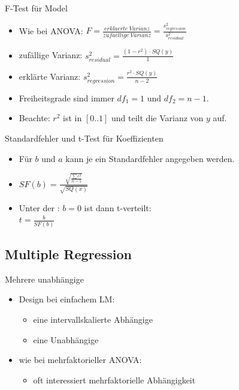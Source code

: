 \begin{frame}
  {F-Test für Model}
  \begin{itemize}[<+->]
    \item Wie bei ANOVA: \alert{$F=\frac{erklaerte\ Varianz}{zufaellige\ Varianz}=\frac{s^2_{regression}}{s^2_{residual}}$}
      \vspace{0.5cm}
    \item zufällige Varianz: \alert{$s^2_{residual}=\frac{(1-r^2)\cdot SQ(y)}{1}$}
    \item erklärte Varianz: \alert{$s^2_{regression}=\frac{r^2\cdot SQ(y)}{n-2}$}
      \vspace{0.5cm}
    \item Freiheitsgrade sind immer $df_1=1$ und $df_2=n-1$.
    \item Beachte: $r^2$ ist in $[0..1]$ und teilt die Varianz von $y$ auf.
  \end{itemize}
\end{frame}

\begin{frame}
  {Standardfehler und t-Test für Koeffizienten}
  \begin{itemize}[<+->]
    \item Für $b$ und $a$ kann je ein Standardfehler angegeben werden. 
      \vspace{0.5cm}
    \item \alert{$SF(b)=\frac{\sqrt{\frac{\sum e^2}{n-1}}}{\sqrt{SQ(x)}}$}
      \vspace{0.5cm}
    \item Unter der \Null: $b=0$ ist dann t-verteilt:\\
      \alert{$t=\frac{b}{SF(b)}$}
  \end{itemize}
\end{frame}

\subsection{Multiple Regression}

\begin{frame}
  {Mehrere unabhängige}
  \begin{itemize}[<+->]
    \item Design bei einfachem LM:
      \begin{itemize}[<+->]
	\item \alert{eine intervallskalierte Abhängige}
	\item \alert{eine Unabhängige}
      \end{itemize}
      \vspace{0.5cm}
    \item wie bei mehrfaktorieller ANOVA:
      \begin{itemize}[<+->]
	\item oft interessiert \alert{mehrfaktorielle Abhängigkeit}
      \end{itemize}
  \end{itemize}
\end{frame}

